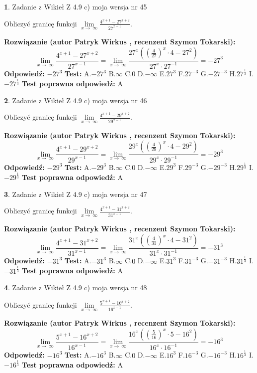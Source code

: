 \documentclass[12pt, a4paper]{article}
\theoremstyle{definition} %
\newtheorem{zad}{}
\newcommand{\zadStart}[1]{\begin{zad}#1\newline}
\newcommand{\zadStop}{\end{zad}}
\newcommand{\rozwStart}[2]{\noindent \textbf{Rozwiązanie (autor #1 , recenzent #2): }\newline}
\newcommand{\rozwStop}{\newline}
\newcommand{\odpStart}{\noindent \textbf{Odpowiedź:}\newline}
\newcommand{\odpStop}{\newline}
\newcommand{\testStart}{\noindent \textbf{Test:}\newline}
\newcommand{\testStop}{\newline}
\newcommand{\kluczStart}{\noindent \textbf{Test poprawna odpowiedź:}\newline}
\newcommand{\kluczStop}{\newline}
\begin{document}
\zadStart{Zadanie z Wikieł Z 4.9 c) moja wersja nr 45}


Obliczyć granicę funkcji  $\lim\limits_{x\to\ \infty}\frac{4^{x+1}-27^{x+2}}{27^{x-1}}$.
\zadStop
\rozwStart{Patryk Wirkus}{Szymon Tokarski}
$$\lim\limits_{x\to\ \infty}\frac{4^{x+1}-27^{x+2}}{27^{x-1}}=\lim\limits_{x\to\ \infty}\frac{27^{x}((\frac{4}{27})^{x}\cdot 4 -27^{2})}{27^{x}\cdot 27^{-1}} = -27^{3}$$
\rozwStop
\odpStart
$-27^{3}$
\odpStop
\testStart
A.$-27^{3}$ B.$\infty$ C.$0$ D.$-\infty$ E.$27^{3}$
F.$27^{-3}$ G.$-27^{-3}$
H.$27^{\frac{1}{3}}$
I.$-27^{\frac{1}{3}}$
\testStop
\kluczStart
A
\kluczStop



\zadStart{Zadanie z Wikieł Z 4.9 c) moja wersja nr 46}


Obliczyć granicę funkcji  $\lim\limits_{x\to\ \infty}\frac{4^{x+1}-29^{x+2}}{29^{x-1}}$.
\zadStop
\rozwStart{Patryk Wirkus}{Szymon Tokarski}
$$\lim\limits_{x\to\ \infty}\frac{4^{x+1}-29^{x+2}}{29^{x-1}}=\lim\limits_{x\to\ \infty}\frac{29^{x}((\frac{4}{29})^{x}\cdot 4 -29^{2})}{29^{x}\cdot 29^{-1}} = -29^{3}$$
\rozwStop
\odpStart
$-29^{3}$
\odpStop
\testStart
A.$-29^{3}$ B.$\infty$ C.$0$ D.$-\infty$ E.$29^{3}$
F.$29^{-3}$ G.$-29^{-3}$
H.$29^{\frac{1}{3}}$
I.$-29^{\frac{1}{3}}$
\testStop
\kluczStart
A
\kluczStop



\zadStart{Zadanie z Wikieł Z 4.9 c) moja wersja nr 47}


Obliczyć granicę funkcji  $\lim\limits_{x\to\ \infty}\frac{4^{x+1}-31^{x+2}}{31^{x-1}}$.
\zadStop
\rozwStart{Patryk Wirkus}{Szymon Tokarski}
$$\lim\limits_{x\to\ \infty}\frac{4^{x+1}-31^{x+2}}{31^{x-1}}=\lim\limits_{x\to\ \infty}\frac{31^{x}((\frac{4}{31})^{x}\cdot 4 -31^{2})}{31^{x}\cdot 31^{-1}} = -31^{3}$$
\rozwStop
\odpStart
$-31^{3}$
\odpStop
\testStart
A.$-31^{3}$ B.$\infty$ C.$0$ D.$-\infty$ E.$31^{3}$
F.$31^{-3}$ G.$-31^{-3}$
H.$31^{\frac{1}{3}}$
I.$-31^{\frac{1}{3}}$
\testStop
\kluczStart
A
\kluczStop



\zadStart{Zadanie z Wikieł Z 4.9 c) moja wersja nr 48}


Obliczyć granicę funkcji  $\lim\limits_{x\to\ \infty}\frac{5^{x+1}-16^{x+2}}{16^{x-1}}$.
\zadStop
\rozwStart{Patryk Wirkus}{Szymon Tokarski}
$$\lim\limits_{x\to\ \infty}\frac{5^{x+1}-16^{x+2}}{16^{x-1}}=\lim\limits_{x\to\ \infty}\frac{16^{x}((\frac{5}{16})^{x}\cdot 5 -16^{2})}{16^{x}\cdot 16^{-1}} = -16^{3}$$
\rozwStop
\odpStart
$-16^{3}$
\odpStop
\testStart
A.$-16^{3}$ B.$\infty$ C.$0$ D.$-\infty$ E.$16^{3}$
F.$16^{-3}$ G.$-16^{-3}$
H.$16^{\frac{1}{3}}$
I.$-16^{\frac{1}{3}}$
\testStop
\kluczStart
A
\kluczStop
\end{document}
